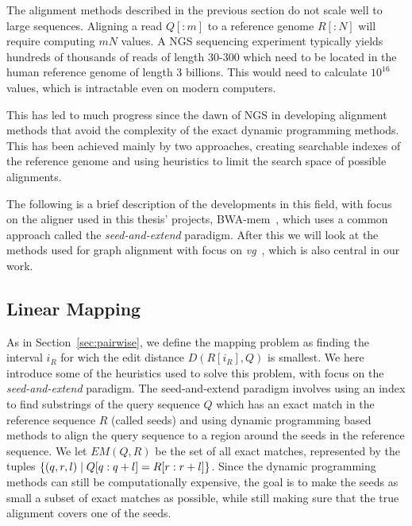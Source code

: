 The alignment methods described in the previous section do not scale well to large sequences.
Aligning a read $Q[:m]$ to a reference genome $R[:N]$ will require computing $mN$ values.
A NGS sequencing experiment typically yields hundreds of thousands of reads of length 30-300 which need to be located in the human reference genome of length 3 billions.
This would need to calculate $10^{16}$ values, which is intractable even on modern computers.

This has led to much progress since the dawn of NGS in developing alignment methods that avoid the complexity of the exact dynamic programming methods.
This has been achieved mainly by two approaches, creating searchable indexes of the reference genome and using heuristics to limit the search space of possible alignments.

The following is a brief description of the developments in this field, with focus on the aligner used in this thesis' projects, BWA-mem~\cite{bwamem}, which uses a common approach called the \emph{seed-and-extend} paradigm.
After this we will look at the methods used for graph alignment with focus on \emph{vg}~\cite{vg}, which is also central in our work.

\subsection{Linear Mapping}
As in Section~\ref{sec:pairwise}, we define the mapping problem as finding the interval $i_R$ for wich the edit distance $D(R[i_R], Q)$ is smallest. We here introduce some of the heuristics used to solve this problem, with focus on the \emph{seed-and-extend} paradigm. The seed-and-extend paradigm involves using an index to find substrings of the query sequence $Q$ which has an exact match in the reference sequence $R$ (called seeds) and using dynamic programming based methods to align the query sequence to a region around the seeds in the reference sequence. We let $EM(Q, R)$ be the set of all exact matches, represented by the tuples $\left\{(q, r, l) \mid Q[q:q+l]=R[r:r+l]\right\}$. Since the dynamic programming methods can still be computationally expensive, the goal is to make the seeds as small a subset of exact matches as possible, while still making sure that the true alignment covers one of the seeds.
 
